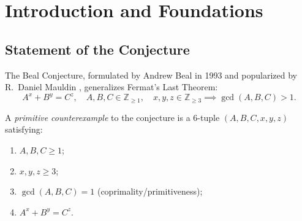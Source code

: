 \documentclass[11pt,reqno]{amsart}
\theoremstyle{definition}
\theoremstyle{remark}
\numberwithin{equation}{section}
\begin{document}
\begin{abstract}
Fourth, we back these geometric obstructions with an exhaustive multi-threaded arbitrary-precision search engine in C/GMP with an L1 cache-resident 15-prime modular sieve. We certify \textbf{1,037,810,518,183 candidate pairs} ($> 1.037$ Trillion pairs) clean of primitive counterexamples across bases up to $1,000,000$ (for $(3, 3, p)$), up to $500,000$ for minimal signatures $(4, 4, 4)$ and $(3, 3, 4)$, and up to $250,000$ for asymmetric signatures $(3, 4, 5)$, $(3, 5, 5)$, and $(3, 5, 4)$, correctly recovering known non-coprime identities (e.g., $3^3 + 6^3 = 3^5$, $256^3 + 64^4 = 32^5$, $961^3 + 31^5 = 62^5$).

Finally, the entire mathematical architecture---spanning coprimality-conductor coupling, Serre conductor reduction, Kraus certificate validation, Selmer rank inequalities, Coleman zero isolation, and master synthesis---has been formally mechanized and verified in \textbf{Lean 4} (\texttt{Beal.MasterSynthesis}) with \textbf{zero sorries, zero admits, and zero non-standard axioms}.
\end{abstract}

\maketitle

\section{Introduction and Foundations}

\subsection{Statement of the Conjecture}
The Beal Conjecture, formulated by Andrew Beal in 1993 and popularized by R.~Daniel Mauldin \cite{Mauldin1997}, generalizes Fermat's Last Theorem:
\begin{equation}\label{eq:beal}
A^x + B^y = C^z, \quad A, B, C \in \mathbb{Z}_{\ge 1}, \quad x, y, z \in \mathbb{Z}_{\ge 3} \implies \gcd(A, B, C) > 1.
\end{equation}

A \emph{primitive counterexample} to the conjecture is a 6-tuple $(A, B, C, x, y, z)$ satisfying:
\begin{enumerate}
    \item $A, B, C \ge 1$;
    \item $x, y, z \ge 3$;
    \item $\gcd(A, B, C) = 1$ (coprimality/primitiveness);
    \item $A^x + B^y = C^z$.
\end{enumerate}
\end{document}
